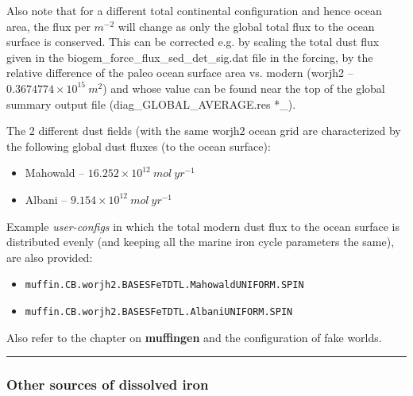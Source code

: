 \documentclass[11pt,fleqn]{book} %
\begin{document}
\begin{enumerate}[noitemsep]
Also note that for a different total continental configuration and hence ocean area, the flux per \(m^{-2}\) will change as only the global total flux to the ocean surface is conserved. This can be corrected e.g. by scaling the total dust flux given in the \textsf{\footnotesize biogem\_force\_flux\_sed\_det\_sig.dat} file in the forcing, by the relative difference of the paleo ocean surface area vs. modern (\textsf{\footnotesize worjh2} -- \(0.3674774\times10^{15} \:m^{2}\)) and whose value can be found near the top of the global summary output file (\textsf{\footnotesize diag\_GLOBAL\_AVERAGE.res }*\_).

\vspace{1mm}
The 2 different dust fields (with the same \textsf{\footnotesize worjh2} ocean grid are characterized by the following global dust fluxes (to the ocean surface):
\vspace{1mm}
\begin{itemize}[noitemsep]
\item Mahowald -- \(16.252\times 10^{12}\:mol\:yr^{-1}\)
\item Albani -- \(9.154\times 10^{12}\:mol\:yr^{-1}\)
\end{itemize}
\vspace{1mm}

Example \textit{user-configs} in which the total modern dust flux to the ocean surface is distributed evenly (and keeping all the marine iron cycle parameters the same), are also provided:
\vspace{1mm}
\begin{itemize}[noitemsep]
\item \texttt{\small muffin.CB.worjh2.BASESFeTDTL.MahowaldUNIFORM.SPIN}
\item \texttt{\small muffin.CB.worjh2.BASESFeTDTL.AlbaniUNIFORM.SPIN}
\end{itemize}
\vspace{1mm}

Also refer to the chapter on \textbf{muffingen} and the configuration of fake worlds.

\end{enumerate}

%
\noindent\rule{4cm}{0.5pt}
\subsubsection{Other sources of dissolved iron}
\vspace{1mm}
\end{document}
